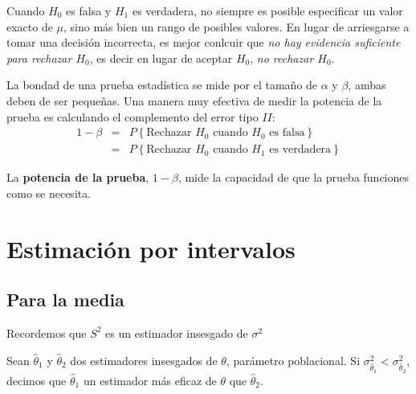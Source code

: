 \begin{Note}
Cuando $H_{0}$ es falsa y $H_{1}$ es verdadera, no siempre es posible especificar un valor exacto de $\mu$, sino m\'as bien un rango de posibles valores.\medskip
En lugar de arriesgarse a tomar una decisi\'on incorrecta, es mejor conlcuir que \textit{no hay evidencia suficiente para rechazar $H_{0}$}, es decir en lugar de aceptar $H_{0}$, \textit{no rechazar $H_{0}$}.

\end{Note}






La bondad de una prueba estad\'istica se mide por el tama\~ no de $\alpha$ y $\beta$, ambas deben de ser peque\~ nas. Una manera muy efectiva de medir la potencia de la prueba es calculando el complemento del error tipo $II$:
\begin{eqnarray*}
1-\beta&= &P\left\{\textrm{Rechazar }H_{0}\textrm{ cuando }H_{0}\textrm{ es falsa}\right\}\\
&=&P\left\{\textrm{Rechazar }H_{0}\textrm{ cuando }H_{1}\textrm{ es verdadera}\right\}
\end{eqnarray*}
\begin{Def}
La \textbf{potencia de la prueba}, $1-\beta$, mide la capacidad de que la prueba funciones como se necesita.
\end{Def}




\section{Estimaci\'on por intervalos}
\subsection*{Para la media}





Recordemos que $S^{2}$ es un estimador insesgado de $\sigma^{2}$
\begin{Def}
Sean $\hat{\theta}_{1}$ y $\hat{\theta}_{2}$ dos estimadores insesgados de $\theta$, par\'ametro poblacional. Si $\sigma_{\hat{\theta}_{1}}^{2}<\sigma_{\hat{\theta}_{2}}^{2}$, decimos que $\hat{\theta}_{1}$ un estimador m\'as eficaz de $\theta$ que $\hat{\theta}_{2}$.
\end{Def}

